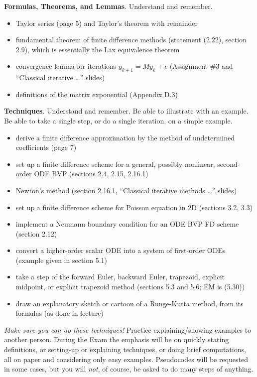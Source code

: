 \documentclass[12pt]{amsart}
\begin{document}
\bigskip

\noindent \textbf{Formulas, Theorems, and Lemmas}.  Understand and remember.
\begin{itemize}
\item Taylor series (page 5) and Taylor's theorem with remainder
\item fundamental theorem of finite difference methods (statement (2.22), section 2.9), which is essentially the Lax equivalence theorem
\item convergence lemma for iterations $y_{k+1} = M y_k + c$ (Assignment \#3 and ``Classical iterative \dots'' slides)
\item definitions of the matrix exponential (Appendix D.3)
\end{itemize}

\bigskip

\noindent \textbf{Techniques}.  Understand and remember.  Be able to illustrate with an example.  Be able to take a single step, or do a single iteration, on a simple example.
\begin{itemize}
\item derive a finite difference approximation by the method of undetermined coefficients (page 7)
\item set up a finite difference scheme for a general, possibly nonlinear, second-order ODE BVP (sections 2.4, 2.15, 2.16.1)
\item Newton's method (section 2.16.1, ``Classical iterative methods \dots'' slides)
\item set up a finite difference scheme for Poisson equation in 2D (sections 3.2, 3.3)
\item implement a Neumann boundary condition for an ODE BVP FD scheme (section 2.12)
\item convert a higher-order scalar ODE into a system of first-order ODEs (example given in section 5.1)
\item take a step of the forward Euler, backward Euler, trapezoid, explicit midpoint, or explicit trapezoid method (sections 5.3 and 5.6; EM is (5.30))
\item draw an explanatory sketch or cartoon of a Runge-Kutta method, from its formulas (as done in lecture)
\end{itemize}

\medskip
\noindent \emph{Make sure you can do these techniques!}  Practice explaining/showing examples to another person.  During the Exam the emphasis will be on quickly stating definitions, or setting-up or explaining techniques, or doing brief computations, all on paper and considering only easy examples.  Pseudocodes will be requested in some cases, but you will \emph{not}, of course, be asked to do many steps of anything.
\vfill
\end{document}
